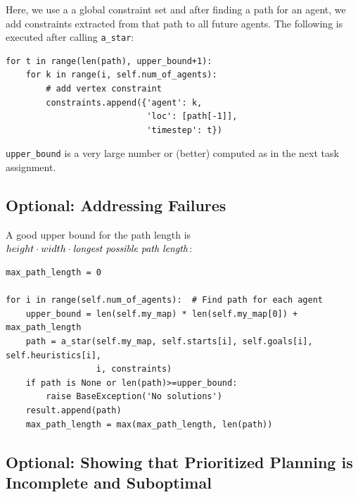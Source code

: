 \documentclass[11pt]{article}
\begin{document}
Here, we use a a global constraint set and after finding a path for an agent, we add constraints extracted from that path to all future agents. The following is executed after calling \texttt{a_star}:

\begin{verbatim}
for t in range(len(path), upper_bound+1):
    for k in range(i, self.num_of_agents):
        # add vertex constraint
        constraints.append({'agent': k,
                            'loc': [path[-1]],
                            'timestep': t})
\end{verbatim}

\texttt{upper_bound} is a very large number or (better) computed as in the next task assignment.

\subsection{Optional: Addressing Failures}

A good upper bound for the path length is $height \cdot width \cdot \mbox{\it longest possible path length}$:

\begin{verbatim}
max_path_length = 0

for i in range(self.num_of_agents):  # Find path for each agent
    upper_bound = len(self.my_map) * len(self.my_map[0]) + max_path_length
    path = a_star(self.my_map, self.starts[i], self.goals[i], self.heuristics[i],
                  i, constraints)
    if path is None or len(path)>=upper_bound:
        raise BaseException('No solutions')
    result.append(path)
    max_path_length = max(max_path_length, len(path))
\end{verbatim}

\subsection{Optional: Showing that Prioritized Planning is Incomplete and Suboptimal}
\end{document}
